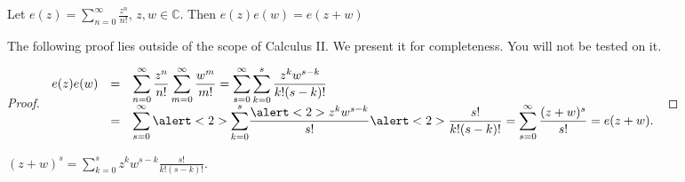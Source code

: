 \begin{frame}
\begin{theorem}
Let $e(z)= \sum\limits_{n=0}^{\infty}\frac{z^n}{n!}$, $z,w\in \mathbb C$. Then $e(z)e(w)=e(z+w)$
\end{theorem}
\alert<1>{The following proof lies outside of the scope of Calculus II. We present it for completeness. You will not be tested on it. }
\begin{proof}
$
\begin{array}{rcll|l}
\displaystyle e(z)e(w)&=&\displaystyle  \sum_{n=0}^{\infty} \frac{z^n}{n!} \sum_{m=0}^{\infty} \frac{w^m}{m!} =  \displaystyle  \sum_{s=0}^{\infty}\sum_{k=0 }^s \frac{z^{k}w^{s-k}}{k! (s-k)!} \\ &=& \displaystyle  \sum_{s=0}^{\infty} \alert<2>{\sum_{k=0 }^s  } \frac{\alert<2>{z^{k}w^{s-k}}}{s!}\alert<2>{ \frac{s!}{k! (s-k)!}} =\displaystyle  \sum_{s=0}^{\infty} \frac{(z+w)^s}{s!}=e(z+w).
\end{array}
$
\end{proof}
\begin{lemma}
\alert<2>{$(z+w)^s=\sum_{k=0 }^s z^{k}w^{s-k} \frac{s!}{k! (s-k)!}$}.
\end{lemma}
\end{frame}